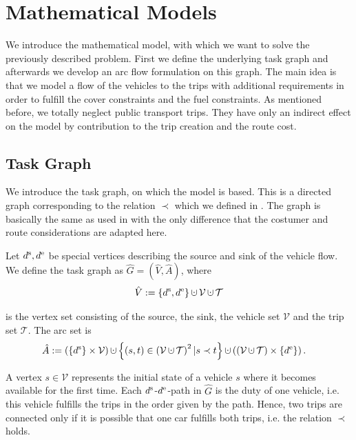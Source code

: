 \chapter{Mathematical Models}

We introduce the mathematical model, with which we want to solve the previously described problem. First we define the underlying task graph and afterwards we develop an arc flow formulation on this graph. The main idea is that we model a flow of the vehicles to the trips with additional requirements in order to fulfill the cover constraints and the fuel constraints. As mentioned before, we totally neglect public transport trips. They have only an indirect effect on the model by contribution to the trip creation and the route cost.

\section{Task Graph}

We introduce the task graph, on which the model is based. This is a directed graph corresponding to the relation $\prec$ which we defined in . The graph is basically the same as used in \cite{Kaiser_Knoll} with the only difference that the costumer and route considerations are adapted here.

\begin{definition}

Let $d^{\operatorname{s}},d^{\operatorname{e}}$ be special vertices describing the source and sink of the vehicle flow. We define the task graph as $\hat{G}=(\hat{V},\hat{A})$, where
\begin{align*}
	\hat{V}:=\left\{\ds,\de\right\}\cupdot\mathcal{V}\cupdot\mathcal{T}
\end{align*}

is the vertex set consisting of the source, the sink, the vehicle set $\mathcal{V}$ and the trip set $\mathcal{T}$. The arc set is
\begin{align*}
	\hat{A} & :=\left(\left\{\ds\right\}\times\mathcal{V}\right)\cupdot\left\{(s,t)\in\left(\mathcal{V}\cupdot\mathcal{T}\right)^2|s\prec t\right\}\cupdot\left(\left(\mathcal{V}\cupdot\mathcal{T}\right)\times\left\{\de\right\}\right).
\end{align*}

\end{definition}

A vertex $s\in\mathcal{V}$ represents the initial state of a vehicle $s$ where it becomes available for the first time. Each $d^{\operatorname{s}}$-$d^{\operatorname{e}}$-path in $\hat{G}$ is the duty of one vehicle, i.e. this vehicle fulfills the trips in the order given by the path. Hence, two trips are connected only if it is possible that one car fulfills both trips, i.e. the relation $\prec$ holds.

